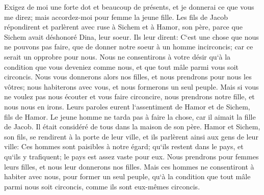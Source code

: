 \verse Exigez de moi une forte dot et beaucoup de présents, et je donnerai ce que vous me direz; mais accordez-moi pour femme la jeune fille. 
\verse Les fils de Jacob répondirent et parlèrent avec ruse à Sichem et à Hamor, son père, parce que Sichem avait déshonoré Dina, leur soeur. 
\verse Ils leur dirent: C`est une chose que nous ne pouvons pas faire, que de donner notre soeur à un homme incirconcis; car ce serait un opprobre pour nous. 
\verse Nous ne consentirons à votre désir qu`à la condition que vous deveniez comme nous, et que tout mâle parmi vous soit circoncis. 
\verse Nous vous donnerons alors nos filles, et nous prendrons pour nous les vôtres; nous habiterons avec vous, et nous formerons un seul peuple. 
\verse Mais si vous ne voulez pas nous écouter et vous faire circoncire, nous prendrons notre fille, et nous nous en irons. 
\verse Leurs paroles eurent l`assentiment de Hamor et de Sichem, fils de Hamor. 
\verse Le jeune homme ne tarda pas à faire la chose, car il aimait la fille de Jacob. Il était considéré de tous dans la maison de son père. 
\verse Hamor et Sichem, son fils, se rendirent à la porte de leur ville, et ils parlèrent ainsi aux gens de leur ville: 
\verse Ces hommes sont paisibles à notre égard; qu`ils restent dans le pays, et qu`ils y trafiquent; le pays est assez vaste pour eux. Nous prendrons pour femmes leurs filles, et nous leur donnerons nos filles. 
\verse Mais ces hommes ne consentiront à habiter avec nous, pour former un seul peuple, qu`à la condition que tout mâle parmi nous soit circoncis, comme ils sont eux-mêmes circoncis. 
